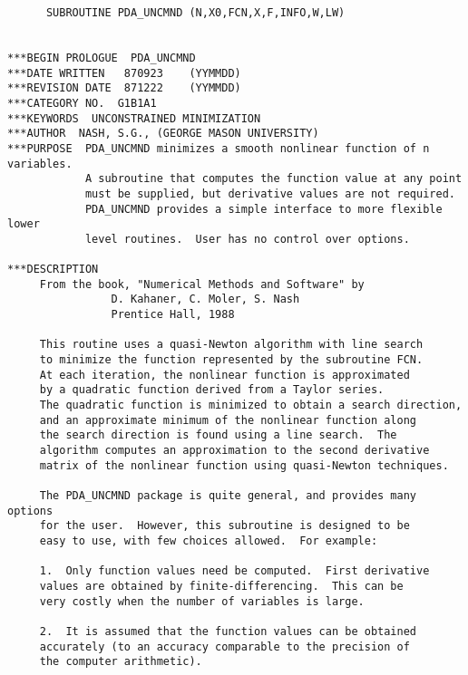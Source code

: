 

\begin{verbatim}
      SUBROUTINE PDA_UNCMND (N,X0,FCN,X,F,INFO,W,LW)


***BEGIN PROLOGUE  PDA_UNCMND
***DATE WRITTEN   870923    (YYMMDD)
***REVISION DATE  871222    (YYMMDD)
***CATEGORY NO.  G1B1A1
***KEYWORDS  UNCONSTRAINED MINIMIZATION
***AUTHOR  NASH, S.G., (GEORGE MASON UNIVERSITY)
***PURPOSE  PDA_UNCMND minimizes a smooth nonlinear function of n variables.
            A subroutine that computes the function value at any point
            must be supplied, but derivative values are not required.
            PDA_UNCMND provides a simple interface to more flexible lower
            level routines.  User has no control over options.

***DESCRIPTION
     From the book, "Numerical Methods and Software" by
                D. Kahaner, C. Moler, S. Nash
                Prentice Hall, 1988

     This routine uses a quasi-Newton algorithm with line search
     to minimize the function represented by the subroutine FCN.
     At each iteration, the nonlinear function is approximated
     by a quadratic function derived from a Taylor series.
     The quadratic function is minimized to obtain a search direction,
     and an approximate minimum of the nonlinear function along
     the search direction is found using a line search.  The
     algorithm computes an approximation to the second derivative
     matrix of the nonlinear function using quasi-Newton techniques.

     The PDA_UNCMND package is quite general, and provides many options
     for the user.  However, this subroutine is designed to be
     easy to use, with few choices allowed.  For example:

     1.  Only function values need be computed.  First derivative
     values are obtained by finite-differencing.  This can be
     very costly when the number of variables is large.

     2.  It is assumed that the function values can be obtained
     accurately (to an accuracy comparable to the precision of
     the computer arithmetic).


\end{verbatim}
